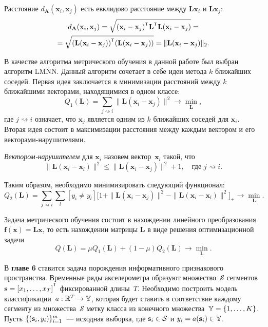 \documentclass[11pt, a5paper]{dissert}
\begin{document}
Расстояние $d_\mathbf{A} (\mathbf{x}_i, \mathbf{x}_j)$ есть евклидово расстояние между $\mathbf{Lx}_i$ и $\mathbf{Lx}_j$:
\begin{multline*}
	d_\mathbf{A} (\mathbf{x}_i, \mathbf{x}_j) = \sqrt{(\mathbf{x}_i - \mathbf{x}_j)^{\T} \mathbf{L}^{\T} \mathbf{L} (\mathbf{x}_i - \mathbf{x}_j)} = \\= \sqrt{(\mathbf{L} (\mathbf{x}_i - \mathbf{x}_j))^{\T} (\mathbf{L} (\mathbf{x}_i - \mathbf{x}_j))} = \|\mathbf{L} (\mathbf{x}_i - \mathbf{x}_j)\|_2.
\end{multline*}

В качестве алгоритма метрического обучения в данной работе был выбран алгоритм LMNN. 
Данный алгоритм сочетает в себе идеи метода $k$ ближайших соседей. 
Первая идея заключается в минимизации расстояний между $k$ ближайшими векторами, находящимися в одном классе:
\[
	Q_1(\mathbf{L}) = \sum_{j \rightsquigarrow i} \|\mathbf{L}(\mathbf{x}_i - \mathbf{x}_j)\|^2 \rightarrow \min_{\mathbf{L}},
\]
где $j \rightsquigarrow i$ означает, что $\mathbf{x}_j$ является одним из $k$ ближайших соседей для $\mathbf{x}_i$.
Вторая идея состоит в максимизации расстояния между каждым вектором и его векторами-нарушителями. 
\begin{definition}
	\textit{Вектором-нарушителем} для $\mathbf{x}_i$ назовем вектор~$\mathbf{x}_l$ такой, что
	\begin{equation}
		\label{ch5:eq:impostor}
		\|\mathbf{L}(\mathbf{x}_i - \mathbf{x}_l)\|^2 \leq \|\mathbf{L}(\mathbf{x}_i - \mathbf{x}_j)\|^2 + 1, \quad \text{где $j \rightsquigarrow i$}.
	\end{equation}
\end{definition}
Таким образом, необходимо минимизировать следующий функционал:
\[
	Q_2(\mathbf{L}) = \sum_{j \rightsquigarrow i} \sum_l [y_i \neq y_l] \bigl[1 + \|\mathbf{L}(\mathbf{x}_i - \mathbf{x}_j)\|^2 - \|\mathbf{L}(\mathbf{x}_i - \mathbf{x}_l)\|^2\bigr]_+ \rightarrow \min_{\mathbf{L}}.
\]

Задача метрического обучения состоит в нахождении линейного преобразования $\mathbf{f}(\mathbf{x}) = \mathbf{Lx}$, то есть нахождении матрицы $\mathbf{L}$ в виде решения оптимизационной задачи
\begin{equation}
	\label{ch5:eq:Qmin}
	Q(\mathbf{L}) = \mu Q_1(\mathbf{L}) + (1 - \mu) Q_2(\mathbf{L}) \rightarrow \min_{\mathbf{L}}.
\end{equation}

В \textbf{главе 6} ставится задача порождения информативного признакового пространства.
Временные ряды акселерометра образуют множество~$\mathcal{S}$ сегментов~$\bs = [x_1, \dots, x_T]^{\T}$ фиксированной длины~$T$.
Необходимо построить модель классификации~$a: \mathbb{R}^T \rightarrow \mathbb{Y}$, которая будет ставить в соответствие каждому сегменту из множества~$\mathcal{S}$ метку класса из конечного множества~$\mathbb{Y} = \{1, \dots, K\}$.
Пусть $\{(\mathbf{s}_i, y_i)\}_{i=1}^m$~--- исходная выборка, где $\mathbf{s}_i \in \mathcal{S}$ и $y_i = a(\mathbf{s}_i)\in \mathbb{Y}$.
\end{document}

